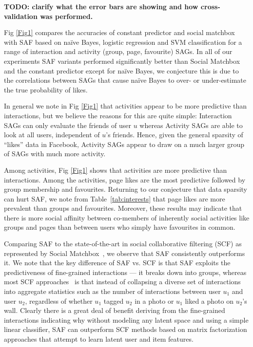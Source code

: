{\bf TODO: clarify what the error bars are showing and how
           cross-validation was performed.}




Fig \ref{Fig1} compares the accuracies of constant predictor and
social matchbox with SAF based on na\"{i}ve Bayes, logistic regression
and SVM classification for a range of interaction and activity (group,
page, favourite) SAGs.  In all of our experiments SAF variants
performed significantly better than Social Matchbox and the constant
predictor except for na\"{i}ve Bayes, we conjecture this is due to the
correlations between SAGs that cause na\"{i}ve Bayes to over- or
under-estimate the true probability of likes.

In general we note in Fig \ref{Fig1} that activities appear to be
more predictive than interactions, but we believe the reasons for this
are quite simple: Interaction SAGs can only evaluate the friends of
user $u$ whereas Activity SAGs are able to look at all users,
independent of $u$'s friends.
Hence, given the general sparsity of ``likes'' data in Facebook, 
Activity SAGs appear to draw on a much larger group of SAGs
with much more activity.

Among activities, Fig \ref{Fig1} shows that activities are more
predictive than interactions. Among the activities, page likes are the
most predictive followed by group membership and favourites.
Returning to our conjecture that data sparsity can hurt SAF, we note
from Table~\ref{tab:interests} that page likes are more prevalent than
groups and favourites.  Moreover, these results may indicate that
there is more social affinity between co-members of inherently social
activities like groups and pages than between users who simply have
favourites in common.

Comparing SAF to the state-of-the-art in social
collaborative filtering (SCF) as represented by Social
Matchbox~\cite{Noel2012NOF}, we observe that SAF consistently
outperforms it.  We note that the key difference of SAF vs. SCF is
that SAF exploits the predictiveness of fine-grained interactions ---
it breaks down into groups, whereas most SCF
approaches~\cite{Noel2012NOF,lla,socinf,sr,rrmf,sorec,ste} is that
instead of collapsing a diverse set of interactions into aggregate
statistics such as the number of interactions between user $u_1$ and
user $u_2$, regardless of whether $u_1$ tagged $u_2$ in a photo or
$u_1$ liked a photo on $u_2$'s wall.  Clearly there is a great deal of
benefit deriving from the fine-grained interactions indicating why
without modeling any latent space and using a simple linear
classifier, SAF can outperform SCF methods based on matrix
factorization approaches that attempt to learn latent user and item
features.

